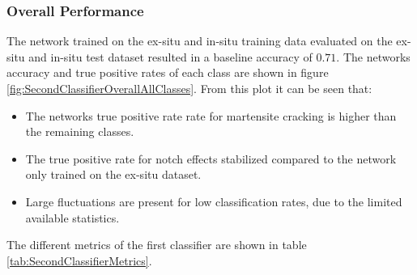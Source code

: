 

\subsubsection{Overall Performance}
The network trained on the ex-situ and in-situ training data evaluated on the ex-situ and in-situ test dataset resulted in a baseline accuracy of $0.71$. The networks accuracy and true positive rates of each class are shown in figure \ref{fig:SecondClassifierOverallAllClasses}. From this plot it can be seen that:
\begin{itemize}
\item The networks true positive rate rate for martensite cracking is higher than the remaining classes.
\item The true positive rate for notch effects stabilized compared to the network only trained on the ex-situ dataset. 
\item Large fluctuations are present for low classification rates, due to the limited available statistics.
\end{itemize}
The different metrics of the first classifier are shown in table \ref{tab:SecondClassifierMetrics}.

